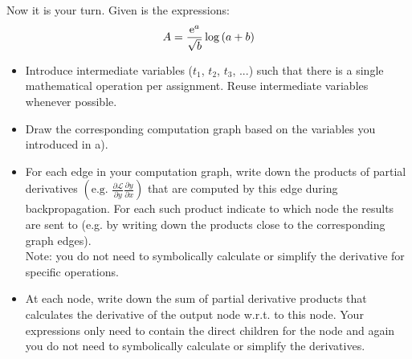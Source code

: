 Now it is your turn. Given is the expressions:
\begin{equation}
    \begin{aligned}
        A &= \frac{{\rm e}^{a}}{\sqrt{b}} \log \left(a + b\right) \\
    \end{aligned}
\end{equation}
\begin{itemize}
    \item[a)] Introduce intermediate variables ($t_1$, $t_2$, $t_3$, ...) such that there is a single mathematical operation per assignment. Reuse intermediate variables whenever possible.
    \subtaskbreak

    \item[b)] Draw the corresponding computation graph based on the variables you introduced in a).
    \subtaskbreak
    
    \item[c)] For each edge in your computation graph, write down the products of partial derivatives $\left(\text{e.g. } \frac{\partial \mathcal{L}}{\partial y} \frac{\partial y}{\partial x}\right)$ that are computed by this edge during backpropagation. For each such product indicate to which node the results are sent to (e.g. by writing down the products close to the corresponding graph edges).\\
    Note: you do not need to symbolically calculate or simplify the derivative for specific operations.
    \subtaskbreak
    
    \item[d)] At each node, write down the sum of partial derivative products that calculates the derivative of the output node w.r.t. to this node. Your expressions only need to contain the direct children for the node and again you do not need to symbolically calculate or simplify the derivatives.
\end{itemize}

